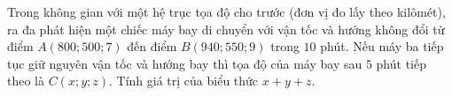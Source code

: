 \begin{ex}%
	Trong không gian với một hệ trục tọa độ cho trước (đơn vị đo lấy theo kilômét), ra đa phát hiện một chiếc máy bay di chuyển với vận tốc và hướng không đổi từ điểm $A(800;500;7)$ đến điểm $B(940;550;9)$ trong $10$ phút. Nếu máy ba tiếp tục giữ nguyên vận tốc và hướng bay thì tọa độ của máy bay sau $5$ phút tiếp theo là $C(x;y;z)$. Tính giá trị của biểu thức $x+y+z$.
\end{ex}

